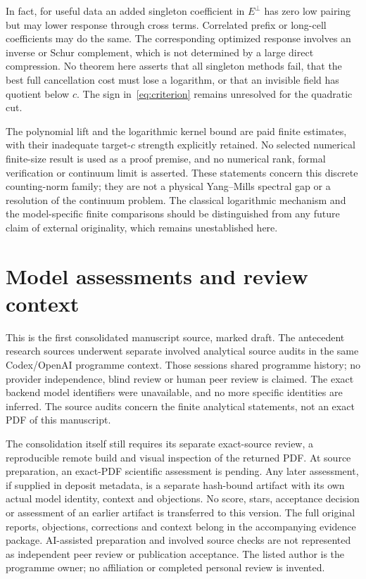 \documentclass[11pt]{article}
\theoremstyle{definition}
\theoremstyle{remark}
\begin{document}
In fact, for useful data an added singleton coefficient in $E^\perp$ has
zero low pairing but may lower response through cross terms. Correlated
prefix or long-cell coefficients may do the same. The corresponding
optimized response involves an inverse or Schur complement, which is not
determined by a large direct compression. No theorem here asserts that
all singleton methods fail, that the best full cancellation cost must
lose a logarithm, or that an invisible field has quotient below $c$.
The sign in~\eqref{eq:criterion} remains unresolved for the quadratic cut.

The polynomial lift and the logarithmic kernel bound are paid finite
estimates, with their inadequate target-$c$ strength explicitly retained.
No selected numerical finite-size result is used as a proof premise, and
no numerical rank, formal verification or continuum limit is asserted.
These statements concern this discrete counting-norm family; they are not
a physical Yang--Mills spectral gap or a resolution of the continuum
problem. The classical logarithmic mechanism and the model-specific
finite comparisons should be distinguished from any future claim of
external originality, which remains unestablished here.

\section*{Model assessments and review context}
This is the first consolidated manuscript source, marked draft. The
antecedent research sources underwent separate involved analytical source
audits in the same Codex/OpenAI programme context. Those sessions shared
programme history; no provider independence, blind review or human peer
review is claimed. The exact backend model identifiers were unavailable,
and no more specific identities are inferred. The source audits concern
the finite analytical statements, not an exact PDF of this manuscript.

The consolidation itself still requires its separate exact-source review,
a reproducible remote build and visual inspection of the returned PDF.
At source preparation, an exact-PDF scientific assessment is pending. Any
later assessment, if supplied in deposit metadata, is a separate hash-bound
artifact with its own actual model identity, context and objections. No score, stars, acceptance
decision or assessment of an earlier artifact is transferred to this
version. The full original reports, objections, corrections and context
belong in the accompanying evidence package. AI-assisted preparation and
involved source checks are not represented as independent peer review or
publication acceptance. The listed author is the programme owner; no
affiliation or completed personal review is invented.
\end{document}
